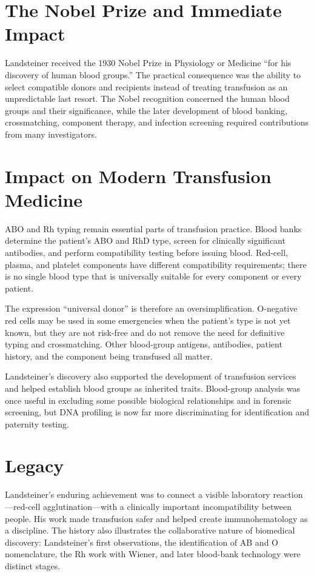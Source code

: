 \section{The Nobel Prize and Immediate Impact}

Landsteiner received the 1930 Nobel Prize in Physiology or Medicine ``for his discovery of human blood groups.'' The practical consequence was the ability to select compatible donors and recipients instead of treating transfusion as an unpredictable last resort. The Nobel recognition concerned the human blood groups and their significance, while the later development of blood banking, crossmatching, component therapy, and infection screening required contributions from many investigators.

\section{Impact on Modern Transfusion Medicine}

ABO and Rh typing remain essential parts of transfusion practice. Blood banks determine the patient's ABO and RhD type, screen for clinically significant antibodies, and perform compatibility testing before issuing blood. Red-cell, plasma, and platelet components have different compatibility requirements; there is no single blood type that is universally suitable for every component or every patient.

The expression ``universal donor'' is therefore an oversimplification. O-negative red cells may be used in some emergencies when the patient's type is not yet known, but they are not risk-free and do not remove the need for definitive typing and crossmatching. Other blood-group antigens, antibodies, patient history, and the component being transfused all matter.

Landsteiner's discovery also supported the development of transfusion services and helped establish blood groups as inherited traits. Blood-group analysis was once useful in excluding some possible biological relationships and in forensic screening, but DNA profiling is now far more discriminating for identification and paternity testing.

\section{Legacy}

Landsteiner's enduring achievement was to connect a visible laboratory reaction---red-cell agglutination---with a clinically important incompatibility between people. His work made transfusion safer and helped create immunohematology as a discipline. The history also illustrates the collaborative nature of biomedical discovery: Landsteiner's first observations, the identification of AB and O nomenclature, the Rh work with Wiener, and later blood-bank technology were distinct stages.

